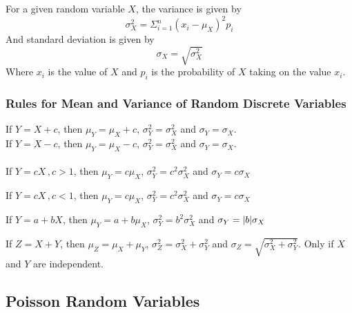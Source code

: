 \documentclass[12pt letter]{report}
\begin{document}
For a given random variable $X$, the variance is given by
\[
  \sigma_{X}^2 = \Sigma_{i=1}^{n} \left( x_i - \mu_{X} \right)^2 p_i
\]
And standard deviation is given by
\[
  \sigma_{X} = \sqrt{\sigma_{X} ^2}
\]
Where $x_i$ is the value of $X$ and $p_i$ is the probability of $X$ taking on the value $x_i$.


\subsubsection{Rules for Mean and Variance of Random Discrete Variables}


If $Y = X + c$, then $\mu_{Y} = \mu_{X} + c$, $\sigma_{Y}^2 = \sigma_{X}^2$ and $\sigma_{Y} = \sigma_{X}$. \\

If $Y = X - c$, then $\mu_{Y} = \mu_{X} - c$, $\sigma_{Y}^2 = \sigma_{X}^2$ and $\sigma_{Y} = \sigma_{X}$. \\

 \\
If $Y = cX\, , c > 1$, then $\mu_{Y} = c \mu_{X}$, $\sigma_{Y}^2 = c^2 \sigma_{X}^2$ and $\sigma_{Y} = c \sigma_{X}$ \\


If $Y = cX\, , c < 1$, then $\mu_{Y} = c \mu_{X}$, $\sigma_{Y}^2 = c^2 \sigma_{X}^2$ and $\sigma_{Y} = c \sigma_{X}$ \\


If $Y = a + bX$, then $\mu_{Y} = a + b \mu_{X}$, $\sigma_{Y}^2 = b^2 \sigma_{X}^2$ and $\sigma_{Y} = \lvert b\rvert \sigma_{X}$ \\


If $Z = X + Y$, then $\mu_{Z} = \mu_{X} + \mu_{Y}$, $\sigma_{Z}^2 = \sigma_{X}^2 + \sigma_{Y}^2$ and $\sigma_{Z} =
  \sqrt{\sigma_{X}^2 + \sigma_{Y}^2}$. Only if $X$ and $Y$ are independent. \\

\subsection{Poisson Random Variables}
\end{document}
